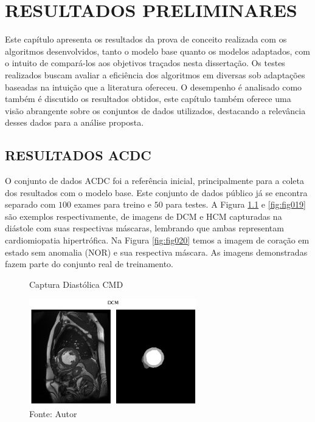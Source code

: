\chapter{RESULTADOS PRELIMINARES}
\label{chap:resultados_discussao}

Este capítulo apresenta os resultados da prova de conceito realizada com os algoritmos desenvolvidos, tanto o modelo base quanto os modelos adaptados, com o intuito de compará-los aos objetivos traçados nesta dissertação. Os testes realizados buscam avaliar a eficiência dos algoritmos em diversas sob adaptações baseadas na intuição que a literatura ofereceu. O desempenho é analisado como também é discutido os resultados obtidos, este capítulo também oferece uma visão abrangente sobre os conjuntos de dados utilizados, destacando a relevância desses dados para a análise proposta.

\section{RESULTADOS ACDC}
\label{sec:resultados_acdc}

O conjunto de dados \gls{ACDC} foi a referência inicial, principalmente para a coleta dos resultados com o modelo base. Este conjunto de dados público já se encontra separado com $100$ exames para treino e $50$ para testes. A Figura \ref{fig:fig018} e \ref{fig:fig019} são exemplos respectivamente, de imagens de \gls{DCM} e \gls{HCM} capturadas na diástole com suas respectivas máscaras, lembrando que ambas representam cardiomiopatia hipertrófica. Na Figura \ref{fig:fig020} temos a imagem de coração em estado sem anomalia (\gls{NOR}) e sua respectiva máscara. As imagens demonstradas fazem parte do conjunto real de treinamento.

\begin{figure}[h!]
    \centering
    \caption{Captura Diastólica CMD}
    \includegraphics[width=0.65\textwidth]{figures/fig018.png}
    \caption*{Fonte: Autor}
    \label{fig:fig018}
\end{figure}

